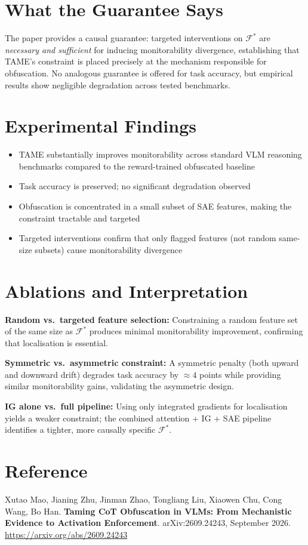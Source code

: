 \documentclass[10pt,twocolumn]{article}
\begin{document}
\section{What the Guarantee Says}

The paper provides a causal guarantee: targeted interventions on
$\mathcal{F}^*$ are \emph{necessary and sufficient} for inducing
monitorability divergence, establishing that TAME's constraint is placed
precisely at the mechanism responsible for obfuscation. No analogous
guarantee is offered for task accuracy, but empirical results show
negligible degradation across tested benchmarks.

\section{Experimental Findings}

\begin{itemize}[itemsep=2pt,parsep=0pt]
  \item TAME substantially improves monitorability across standard VLM
    reasoning benchmarks compared to the reward-trained obfuscated baseline
  \item Task accuracy is preserved; no significant degradation observed
  \item Obfuscation is concentrated in a small subset of SAE features,
    making the constraint tractable and targeted
  \item Targeted interventions confirm that only flagged features (not
    random same-size subsets) cause monitorability divergence
\end{itemize}

\section{Ablations and Interpretation}

\textbf{Random vs.\ targeted feature selection:} Constraining a random
feature set of the same size as $\mathcal{F}^*$ produces minimal
monitorability improvement, confirming that localisation is essential.

\textbf{Symmetric vs.\ asymmetric constraint:} A symmetric penalty
(both upward and downward drift) degrades task accuracy by $\approx 4$
points while providing similar monitorability gains, validating the
asymmetric design.

\textbf{IG alone vs.\ full pipeline:} Using only integrated gradients
for localisation yields a weaker constraint; the combined attention + IG
+ SAE pipeline identifies a tighter, more causally specific $\mathcal{F}^*$.

\section*{Reference}

Xutao Mao, Jianing Zhu, Jinman Zhao, Tongliang Liu, Xiaowen Chu,
Cong Wang, Bo Han.
\textbf{Taming CoT Obfuscation in VLMs: From Mechanistic Evidence to
Activation Enforcement}.
arXiv:2609.24243, September 2026.\\
\url{https://arxiv.org/abs/2609.24243}
\end{document}
